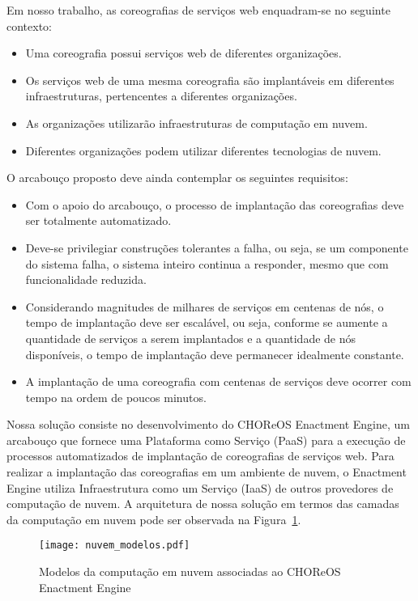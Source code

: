 Em nosso trabalho, as coreografias de serviços web enquadram-se no seguinte contexto:

\begin{itemize}
\item Uma coreografia possui serviços web de diferentes organizações.
\item Os serviços web de uma mesma coreografia são implantáveis em diferentes infraestruturas, pertencentes a diferentes organizações.
\item As organizações utilizarão infraestruturas de computação em nuvem.
\item Diferentes organizações podem utilizar diferentes tecnologias de nuvem.
\end{itemize}

O arcabouço proposto deve ainda contemplar os seguintes requisitos:

\begin{itemize}
\item Com o apoio do arcabouço, o processo de implantação das coreografias deve ser totalmente automatizado.
\item Deve-se privilegiar construções tolerantes a falha, ou seja, se um componente do sistema falha, o sistema inteiro continua a responder, mesmo que com funcionalidade reduzida.
\item Considerando magnitudes de milhares de serviços em centenas de nós, o tempo de implantação deve ser escalável, ou seja, conforme se aumente a quantidade de serviços a serem implantados e a quantidade de nós disponíveis, o tempo de implantação deve permanecer idealmente constante. 
\item A implantação de uma coreografia com centenas de serviços deve ocorrer com tempo na ordem de poucos minutos.
\end{itemize}

Nossa solução consiste no desenvolvimento do CHOReOS Enactment Engine, um arcabouço que fornece uma Plataforma como Serviço (PaaS) para a execução de processos automatizados de implantação de coreografias de serviços web. Para realizar a implantação das coreografias em um ambiente de nuvem, o Enactment Engine utiliza Infraestrutura como um Serviço (IaaS) de outros provedores de computação de nuvem. A arquitetura de nossa solução em termos das camadas da computação em nuvem pode ser observada na Figura~\ref{fig:camadas_nuvem}.

\begin{figure}[!h]
  \centering
  \texttt{[image: nuvem\_modelos.pdf]} 
  \caption{Modelos da computação em nuvem associadas ao CHOReOS Enactment Engine}
  \label{fig:camadas_nuvem} 
\end{figure}

